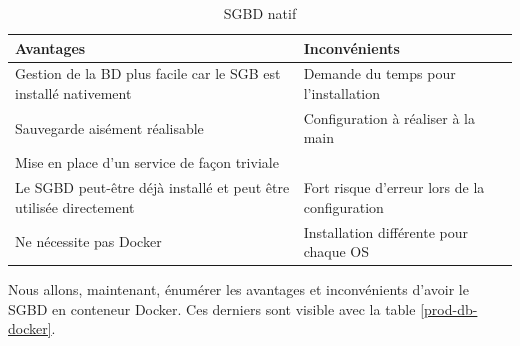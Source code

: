 \documentclass[
    iai, %
    il, %
]{heig-tb}
\begin{document}
\begin{table}[h]
    \begin{center}
        \caption{SGBD natif \label{prod-db-native}}
        \begin{tabularx}{1.0\textwidth} {X|X}
            Avantages                                                         & Inconvénients                          \\ \hline
            Gestion de la BD plus facile car le SGB est installé nativement   & Demande du temps
            pour l'installation                                                                                        \\
            Sauvegarde aisément réalisable                                    & Configuration à réaliser à la main     \\
            Mise en place d'un service de façon triviale                      &                                        \\
            Le SGBD peut-être déjà installé et peut être utilisée directement & Fort risque
            d'erreur lors de la configuration                                                                          \\
            Ne nécessite pas Docker                                           & Installation différente pour chaque OS \\
        \end{tabularx}
    \end{center}
\end{table}

Nous allons, maintenant, énumérer les avantages et inconvénients d'avoir le SGBD en conteneur
Docker. Ces derniers sont visible avec la table \ref{prod-db-docker}.
\end{document}

